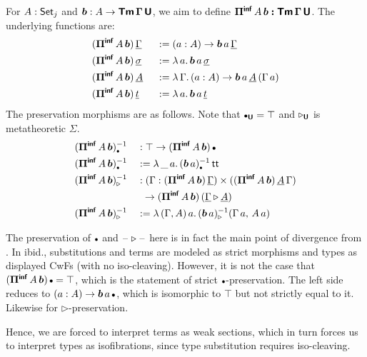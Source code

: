\documentclass[sigplan,review,anonymous]{acmart}\settopmatter{printfolios=true,printccs=false,printacmref=false}
\newcommand{\ext}{\triangleright}
\newcommand{\emptycon}{\scaleobj{.75}\bullet}
\newcommand{\Piinf}{\Pi^{\mathsf{inf}}}
\newcommand{\bTm}{\boldsymbol{\Tm}}
\newcommand{\bGamma}{\boldsymbol{\Gamma}}
\newcommand{\bb}{\boldsymbol{b}}
\newcommand{\bU}{\boldsymbol{\U}}
\newcommand{\bPiinf}{\boldsymbol{\Piinf}}
\newcommand{\ul}[1]{\underline{#1}}
\newcommand{\ulGamma}{\ul{\Gamma}}
\newcommand{\ulsigma}{\ul{\sigma}}
\newcommand{\ult}{\ul{t}}
\newcommand{\ulA}{\ul{A}}
\begin{document}
For $A : \mathsf{Set}_j$ and $\bb : A \ra \bTm\,\bGamma\,\bU$, we aim to define
$\bPiinf\,A\,\bb \boldsymbol{:} \bTm\,\bGamma\,\bU$. The underlying functions
are:
\begin{alignat*}{3}
  & (\bPiinf\,A\,\bb)\,\ulGamma    &&:= (a : A)\ra \bb\,a\,\ulGamma\\
  & (\bPiinf\,A\,\bb)\,\ulsigma    &&:= \lambda\,a.\, \bb\,a\,\ulsigma\\
  & (\bPiinf\,A\,\bb)\,\ulA\       &&:= \lambda\,\Gamma.\,(a : A)\ra \bb\,a\,\ulA\,(\Gamma\, a)\\
  & (\bPiinf\,A\,\bb)\,\ult        &&:= \lambda\,a.\, \bb\,a\,\ult
\end{alignat*}
The preservation morphisms are as follows. Note that $\emptycon_{\bU} = \top$ and $\ext_{\bU}$ is
metatheoretic $\Sigma$.
\begin{alignat*}{3}
  &(\bPiinf\,A\,\bb)_{\emptycon}^{-1} && : \top\ra (\bPiinf\,A\,\bb)\,\emptycon\\
  &(\bPiinf\,A\,\bb)_{\emptycon}^{-1} && := \lambda\,\_\,a.\,(\bb\,a)_{\emptycon}^{-1}\,\tt\\
  &(\bPiinf\,A\,\bb)_{\ext}^{-1} && : (\Gamma : (\bPiinf\,A\,\bb)\,\ulGamma)\times((\bPiinf\,A\,\bb)\,\ulA\,\Gamma)\\
  & && \hspace{0.5em}\ra (\bPiinf\,A\,\bb)\,(\ulGamma \ext \ulA)\\
  & (\bPiinf\,A\,\bb)_{\ext}^{-1} && := \lambda\,(\Gamma,A)\,a.\,(\bb\,a)_{\ext}^{-1}(\Gamma\,a,\,A\,a)
\end{alignat*}

The preservation of $\emptycon$ and $\blank\ext\blank$ here is in fact the main
point of divergence from \cite{kaposi2019constructing}. In ibid., substitutions
and terms are modeled as strict morphisms and types as displayed CwFs (with no
iso-cleaving). However, it is not the case that $(\bPiinf\,A\,\bb)\,\emptycon =
\top$, which is the statement of strict $\emptycon$-preservation. The left side
reduces to $(a : A)\ra \bb\,a\,\emptycon$, which is isomorphic to $\top$ but not
strictly equal to it. Likewise for $\ext$-preservation.

Hence, we are forced to
interpret terms as weak sections, which in turn forces us to interpret
types as isofibrations, since type substitution requires iso-cleaving.
\end{document}
